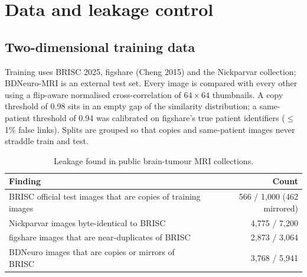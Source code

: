 \documentclass[11pt,a4paper]{article}
\begin{document}
\section{Data and leakage control}
\subsection{Two-dimensional training data}
Training uses BRISC 2025, figshare (Cheng 2015) and the Nickparvar collection; BDNeuro-MRI is an external test set.
Every image is compared with every other using a flip-aware normalised cross-correlation of $64\times64$ thumbnails.
A copy threshold of 0.98 sits in an empty gap of the similarity distribution; a same-patient threshold of 0.94 was
calibrated on figshare's true patient identifiers ($\le$1\% false links). Splits are grouped so that copies and
same-patient images never straddle train and test.

\begin{table}[H]\centering\small
\begin{tabular}{@{}lr@{}}
\toprule
\textbf{Finding} & \textbf{Count} \\
\midrule
BRISC official test images that are copies of training images & 566 / 1{,}000 (462 mirrored) \\
Nickparvar images byte-identical to BRISC & 4{,}775 / 7{,}200 \\
figshare images that are near-duplicates of BRISC & 2{,}873 / 3{,}064 \\
BDNeuro images that are copies or mirrors of BRISC & 3{,}768 / 5{,}941 \\
\bottomrule
\end{tabular}
\caption{Leakage found in public brain-tumour MRI collections.}
\end{table}
\end{document}
